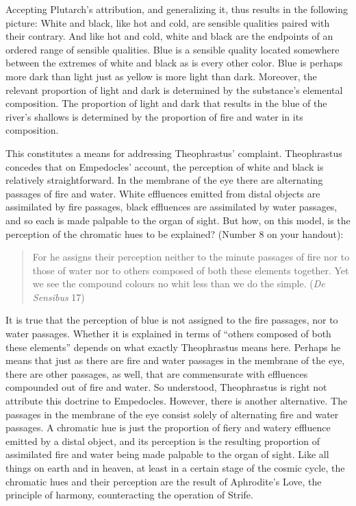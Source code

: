 Accepting Plutarch's attribution, and generalizing it, thus results in the following picture: White and black, like hot and cold, are sensible qualities paired with their contrary. And like hot and cold, white and black are the endpoints of an ordered range of sensible qualities. Blue is a sensible quality located somewhere between the extremes of white and black as is every other color. Blue is perhaps more dark than light just as yellow is more light than dark. Moreover, the relevant proportion of light and dark is determined by the substance's elemental composition. The proportion of light and dark that results in the blue of the river's shallows is determined by the proportion of fire and water in its composition.

This constitutes a means for addressing Theophrastus' complaint. Theo\-phrastus concedes that on Empedocles' account, the perception of white and black is relatively straightforward. In the membrane of the eye there are alternating passages of fire and water. White effluences emitted from distal objects are assimilated by fire passages, black effluences are assimilated by water passages, and so each is made palpable to the organ of sight. But how, on this model, is the perception of the chromatic hues to be explained? (Number 8 on your handout):
\begin{quote}
	For he assigns their perception neither to the minute passages of fire nor to those of water nor to others composed of both these elements together. Yet we see the compound colours no whit less than we do the simple. (\emph{De Sensibus} 17)
\end{quote}

It is true that the perception of blue is not assigned to the fire passages, nor to water passages. Whether it is explained in terms of ``others composed of both these elements'' depends on what exactly Theophrastus means here. Perhaps he means that just as there are fire and water passages in the membrane of the eye, there are other passages, as well, that are commensurate with effluences compounded out of fire and water. So understood, Theophrastus is right not attribute this doctrine to Empedocles. However, there is another alternative. The passages in the membrane of the eye consist solely of alternating fire and water passages. A chromatic hue is just the proportion of fiery and watery effluence emitted by a distal object, and its perception is the resulting proportion of assimilated fire and water being made palpable to the organ of sight. Like all things on earth and in heaven, at least in a certain stage of the cosmic cycle, the chromatic hues and their perception are the result of Aphrodite's Love, the principle of harmony, counteracting the operation of Strife. \change

